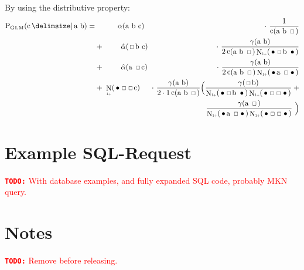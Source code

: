 \documentclass[11pt,a4paper]{report}
\newcommand*{\Scale}[2][4]{\scalebox{#1}{$#2$}}%
\DeclareMathOperator{\Count}{c}
\DeclareMathOperator{\ContCount}{N}
\newcommand{\ContCountIp}  {\ContCount_{\Scale[0.5]{1+}}}
\newcommand{\Skp}{\ensuremath{\,\Scale[0.7]{\square}\,}}
\newcommand{\WSkp}{\ensuremath{\,\bullet\,}}
\newcommand{\todo}[1]{\textcolor{red}{{\footnotesize\textbf{\texttt{TODO:}}} #1}}
\begin{document}
{\begin{appendices}
By using the distributive property:
\begin{eqnarray}
  \ProbGLM {\text{c}}{\text{a b}} =
    &\phantom{+} \; \hspace{2.0em}     \alpha(\text{a b c})    & \hspace{-0.5em} \cdot\  \frac{1}{\Count(\text{a b \Skp})} \\
    &         +  \; \hspace{2.0em} \hat\alpha(\text{\Skp b c}) & \hspace{-0.5em} \cdot\  \frac{\gamma(\text{a b})}{2 \Count(\text{a b \Skp}) \ContCountIp(\text{\WSkp \Skp b \WSkp})} \nonumber \\
    &         +  \; \hspace{2.0em} \hat\alpha(\text{a \Skp c}) & \hspace{-0.5em} \cdot\  \frac{\gamma(\text{a b})}{2 \Count(\text{a b \Skp}) \ContCountIp(\text{\WSkp a \Skp \WSkp})} \nonumber \\
    &         +  \; \ContCountIp(\text{\WSkp\Skp \Skp c})      & \hspace{-0.5em} \cdot\  \frac{\gamma(\text{a b})}{2 \cdot 1 \Count(\text{a b \Skp})} \Big(\frac{\gamma(\text{\Skp b})}{\ContCountIp(\text{\WSkp \Skp b \WSkp}) \ContCountIp(\text{\WSkp \Skp \Skp \WSkp})} \: + \nonumber \\
    &                                                          & \hspace{6.8em}                                                                            \frac{\gamma(\text{a \Skp})}{\ContCountIp(\text{\WSkp a \Skp \WSkp}) \ContCountIp(\text{\WSkp \Skp \Skp \WSkp})} \ \Big) \nonumber
\end{eqnarray}

\chapter{Example SQL-Request}
\label{app:sql-example}

\todo{With database examples, and fully expanded SQL code, probably MKN query.}

\chapter{Notes}

\todo{Remove before releasing.}


\end{appendices}}
\end{document}
